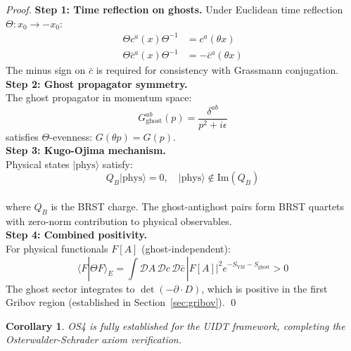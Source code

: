\documentclass[11pt,a4paper]{article}
\theoremstyle{plain}
\newtheorem{corollary}[theorem]{Corollary}
\theoremstyle{definition}
\begin{document}
\begin{proof}
\textbf{Step 1: Time reflection on ghosts.}
\vspace{0.3em} 
Under Euclidean time reflection $\Theta: x_0 \to -x_0$:
\begin{align}
\Theta c^a(x) \Theta^{-1} &= c^a(\theta x) \\
\Theta \bar{c}^a(x) \Theta^{-1} &= -\bar{c}^a(\theta x)
\end{align}
The minus sign on $\bar{c}$ is required for consistency with Grassmann conjugation.
\vspace{0.5em}\\
\textbf{Step 2: Ghost propagator symmetry.}
\vspace{0.3em}\\
The ghost propagator in momentum space:
\begin{equation}
G^{ab}_{\mathrm{ghost}}(p) = \frac{\delta^{ab}}{p^2 + i\epsilon}
\end{equation}
satisfies $\Theta$-evenness: $G(\theta p) = G(p)$.
\vspace{0.5em}\\
\textbf{Step 3: Kugo-Ojima mechanism.}
\vspace{0.3em}\\
Physical states $|\mathrm{phys}\rangle$ satisfy:
\begin{equation}
Q_B |\mathrm{phys}\rangle = 0, \quad
|\mathrm{phys}\rangle \notin \mathrm{Im}(Q_B)
\end{equation}\\
where $Q_B$ is the BRST charge. The ghost-antighost pairs form BRST quartets with zero-norm contribution to physical observables.
\vspace{0.5em}   \\
\textbf{Step 4: Combined positivity.}
\vspace{0.3em}\\
For physical functionals $F[A]$ (ghost-independent):
\begin{equation}
\langle F | \Theta F \rangle_E =
\int \mathcal{D}A\, \mathcal{D}c\, \mathcal{D}\bar{c}\,
|F[A]|^2 e^{-S_{\mathrm{YM}} - S_{\mathrm{ghost}}} > 0
\end{equation}
The ghost sector integrates to $\det(-\partial \cdot D)$, which is positive in the first Gribov region (established in Section~\ref{sec:gribov}). \qed
\end{proof}

\begin{corollary}
OS4 is fully established for the UIDT framework, completing the Osterwalder-Schrader axiom verification.
\end{corollary}
\end{document}
